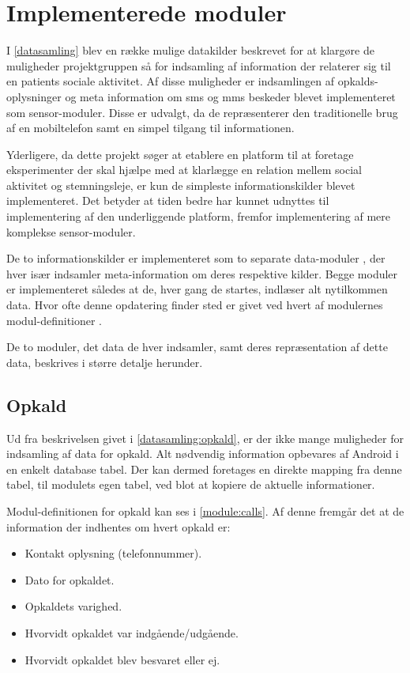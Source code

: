 \chapter{Implementerede moduler}\label{implementerede_moduler}
I \cref{datasamling} blev en række mulige datakilder beskrevet for at klargøre de muligheder projektgruppen så for indsamling af information der relaterer sig til en patients sociale aktivitet.
Af disse muligheder er indsamlingen af opkalds-oplysninger og meta information om sms og mms beskeder blevet implementeret som sensor-moduler.
Disse er udvalgt, da de repræsenterer den traditionelle brug af en mobiltelefon samt en simpel tilgang til informationen.

Yderligere, da dette projekt søger at etablere en platform til at foretage eksperimenter der skal hjælpe med at klarlægge en relation mellem social aktivitet og stemningsleje, er kun de simpleste informationskilder blevet implementeret.
Det betyder at tiden bedre har kunnet udnyttes til implementering af den underliggende platform, fremfor implementering af mere komplekse sensor-moduler.

De to informationskilder er implementeret som to separate data-moduler , der hver især indsamler meta-information om deres respektive kilder.
Begge moduler er implementeret således at de, hver gang de startes, indlæser alt nytilkommen data.
Hvor ofte denne opdatering finder sted er givet ved hvert af modulernes modul-definitioner .

De to moduler, det data de hver indsamler, samt deres repræsentation af dette data, beskrives i større detalje herunder.

\section{Opkald}\label{implementerede_moduler:opkald}
Ud fra beskrivelsen givet i \cref{datasamling:opkald}, er der ikke mange muligheder for indsamling af data for opkald.
Alt nødvendig information opbevares af Android i en enkelt database tabel.
Der kan dermed foretages en direkte mapping fra denne tabel, til modulets egen tabel, ved blot at kopiere de aktuelle informationer.

Modul-definitionen for opkald kan ses i \cref{module:calls}.
Af denne fremgår det at de information der indhentes om hvert opkald er:
\begin{itemize}
\item Kontakt oplysning (telefonnummer).
\item Dato for opkaldet.
\item Opkaldets varighed.
\item Hvorvidt opkaldet var indgående/udgående.
\item Hvorvidt opkaldet blev besvaret eller ej.
\end{itemize}

